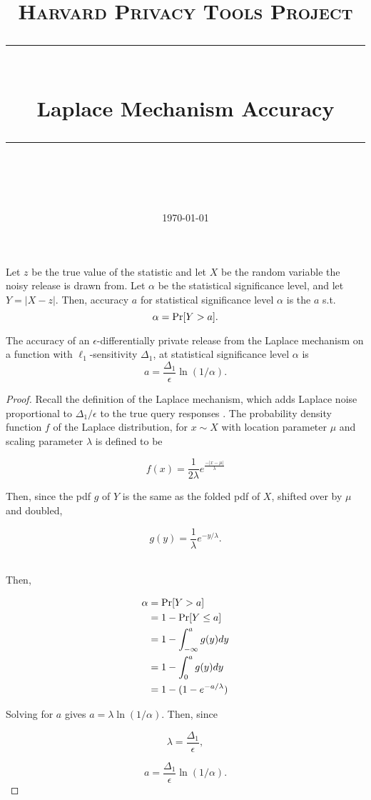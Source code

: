 \documentclass[11pt]{scrartcl} %
\title{
	\normalfont\normalsize
	\textsc{Harvard Privacy Tools Project}\\ %
	\vspace{25pt} %
	\rule{\linewidth}{0.5pt}\\ %
	\vspace{20pt} %
	{\huge Laplace Mechanism Accuracy}\\ %
	\vspace{12pt} %
	\rule{\linewidth}{2pt}\\ %
	\vspace{12pt} %
}
\date{\normalsize\today} %
\begin{document}
\maketitle


\begin{definition}
Let $z$ be the true value of the statistic and let $X$ be the random variable the noisy release is drawn from. Let $\alpha$ be the statistical significance level, and let $Y = \vert X-z \vert.$ Then, accuracy $a$ for statistical significance level $\alpha$ is the $a$ s.t.
$$ \alpha = \text{Pr}[Y > a].$$
\end{definition}

\begin{theorem}
The accuracy of an $\epsilon$-differentially private release from the Laplace mechanism on a function with $\ell_1$-sensitivity $\Delta_1$, at statistical significance level $\alpha$ is
$$ a = \frac{\Delta_1}{\epsilon}\ln(1/\alpha).$$
\end{theorem}

\begin{proof}
Recall the definition of the Laplace mechanism, which adds Laplace noise proportional to $\Delta_1/\epsilon$ to the true query responses \cite{DMNS06}. The probability density function $f$ of the Laplace distribution, for $x \sim X$ with location parameter $\mu$ and scaling parameter $\lambda$ is defined to be

$$ f(x) = \frac{1}{2\lambda}e^{\frac{-\vert x-\mu \vert}{ \lambda}}$$

Then, since the pdf $g$ of $Y$ is the same as the folded pdf of $X$, shifted over by $\mu$ and doubled,

$$ g(y) = \frac{1}{\lambda}e^{-y/\lambda}.$$\

Then, 

\begin{align*}
\alpha &= \text{Pr}[Y>a] \\
	&= 1 - \text{Pr}[Y\le a]\\
	&= 1 - \int_{-\infty}^a g(y) dy \\
	&= 1 - \int_0^a g(y) dy \\
	&= 1 - (1-e^{-a/\lambda})
\end{align*}

Solving for $a$ gives $a = \lambda \ln (1/\alpha)$. Then, since 

$$\lambda = \frac{\Delta_1}{\epsilon},$$

$$ a = \frac{\Delta_1}{\epsilon}\ln(1/\alpha).$$
\end{proof}



\end{document}
